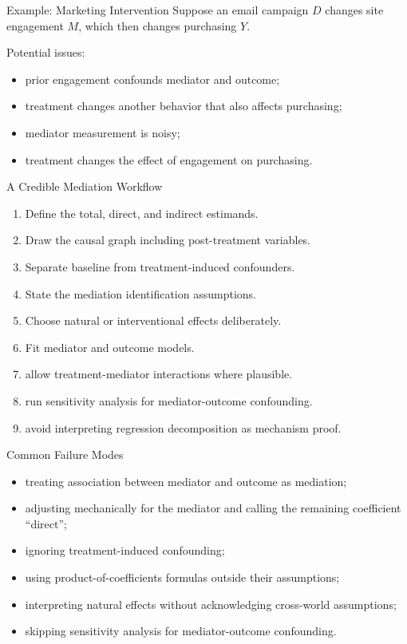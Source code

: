 \documentclass[aspectratio=169,11pt]{beamer}
\begin{document}
\begin{frame}{Example: Marketing Intervention}
Suppose an email campaign \(D\) changes site engagement \(M\), which then changes purchasing \(Y\).

Potential issues:
\begin{itemize}
\item prior engagement confounds mediator and outcome;
\item treatment changes another behavior that also affects purchasing;
\item mediator measurement is noisy;
\item treatment changes the effect of engagement on purchasing.
\end{itemize}
\end{frame}

\begin{frame}{A Credible Mediation Workflow}
\begin{enumerate}
\item Define the total, direct, and indirect estimands.
\item Draw the causal graph including post-treatment variables.
\item Separate baseline from treatment-induced confounders.
\item State the mediation identification assumptions.
\item Choose natural or interventional effects deliberately.
\item Fit mediator and outcome models.
\item allow treatment-mediator interactions where plausible.
\item run sensitivity analysis for mediator-outcome confounding.
\item avoid interpreting regression decomposition as mechanism proof.
\end{enumerate}
\end{frame}

\begin{frame}{Common Failure Modes}
\begin{itemize}
\item treating association between mediator and outcome as mediation;
\item adjusting mechanically for the mediator and calling the remaining coefficient “direct”;
\item ignoring treatment-induced confounding;
\item using product-of-coefficients formulas outside their assumptions;
\item interpreting natural effects without acknowledging cross-world assumptions;
\item skipping sensitivity analysis for mediator-outcome confounding.
\end{itemize}
\end{frame}
\end{document}
